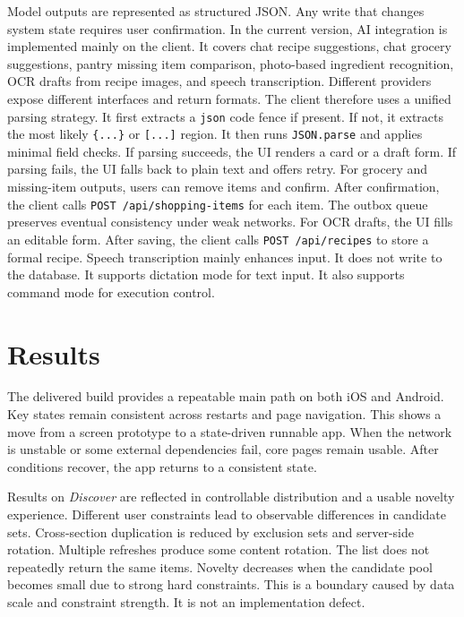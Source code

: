 \documentclass[journal]{IEEEtran}
\begin{document}
Model outputs are represented as structured JSON. Any write that changes system state requires user confirmation. In the current version, AI integration is implemented mainly on the client. It covers chat recipe suggestions, chat grocery suggestions, pantry missing item comparison, photo-based ingredient recognition, OCR drafts from recipe images, and speech transcription. Different providers expose different interfaces and return formats. The client therefore uses a unified parsing strategy. It first extracts a \texttt{json} code fence if present. If not, it extracts the most likely \texttt{\{...\}} or \texttt{[...]} region. It then runs \texttt{JSON.parse} and applies minimal field checks. If parsing succeeds, the UI renders a card or a draft form. If parsing fails, the UI falls back to plain text and offers retry. For grocery and missing-item outputs, users can remove items and confirm. After confirmation, the client calls \texttt{POST /api/shopping-items} for each item. The outbox queue preserves eventual consistency under weak networks. For OCR drafts, the UI fills an editable form. After saving, the client calls \texttt{POST /api/recipes} to store a formal recipe. Speech transcription mainly enhances input. It does not write to the database. It supports dictation mode for text input. It also supports command mode for execution control.

\section{Results}

The delivered build provides a repeatable main path on both iOS and Android. Key states remain consistent across restarts and page navigation. This shows a move from a screen prototype to a state-driven runnable app. When the network is unstable or some external dependencies fail, core pages remain usable. After conditions recover, the app returns to a consistent state.

Results on \textit{Discover} are reflected in controllable distribution and a usable novelty experience. Different user constraints lead to observable differences in candidate sets. Cross-section duplication is reduced by exclusion sets and server-side rotation. Multiple refreshes produce some content rotation. The list does not repeatedly return the same items. Novelty decreases when the candidate pool becomes small due to strong hard constraints. This is a boundary caused by data scale and constraint strength. It is not an implementation defect.
\end{document}
